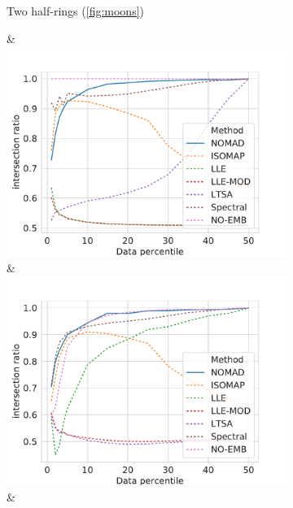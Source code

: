 \documentclass[twoside,11pt]{article}
\begin{document}
\begin{figure}
\begin{subfigure}{\textwidth}
\begin{footnotesize}
\begin{tabu}
		\begin{sideways}
        	Two half-rings (\cref{fig:moons})
        \end{sideways} &
		\includegraphics[width=\linewidth]{figures/geodesics/geodesics_moons_orthogonal_noise000} &
		\includegraphics[width=\linewidth]{figures/geodesics/geodesics_moons_orthogonal_noise005} &

\end{tabu}
\end{footnotesize}
\end{subfigure}
\end{figure}
\end{document}
